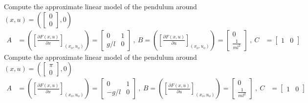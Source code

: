 \documentclass[twoside]{article}
\begin{document}
Compute the approximate linear model of the pendulum around $(x,u) =
\left( \left[ \begin{array}{c} 0 \\ 0 \end{array} \right] , 0 \right)$
%
\begin{align*}
A &= \left( \left[ \frac{\partial F(x,u)}{\partial x}
                      \right]_{(x_o,u_o)} \right) =
                    \left[ \begin{array}{cc} 0 & 1 \\ g/l & 0 \end{array}  \right]
\ , \ B = \left( \left[ \frac{\partial F(x,u)}{\partial u}
                      \right]_{(x_o,u_o)} \right) =
                                                            \left[ \begin{array}{c}
                                                                     0
                                                                     \\
                                                                     \frac{1}{m
                                                                     l^2}  \end{array}  \right]
\ , \
C &= \left[ \begin{array}{cc} 1 & 0 \end{array}  \right]
\end{align*}
%
Compute the approximate linear model of the pendulum around $(x,u) =
\left( \left[ \begin{array}{c} \pi \\ 0 \end{array} \right] , 0 \right)$
%
\begin{align*}
A &= \left( \left[ \frac{\partial F(x,u)}{\partial x}
                      \right]_{(x_o,u_o)} \right) =
                    \left[ \begin{array}{cc} 0 & 1 \\ -g/l & 0 \end{array}  \right]
\ , \ B = \left( \left[ \frac{\partial F(x,u)}{\partial u}
                      \right]_{(x_o,u_o)} \right) =
                                                            \left[ \begin{array}{c}
                                                                     0
                                                                     \\
                                                                     \frac{1}{m
                                                                     l^2}  \end{array}  \right]
\ , \
C &= \left[ \begin{array}{cc} 1 & 0 \end{array}  \right]
\end{align*}
\end{document}
